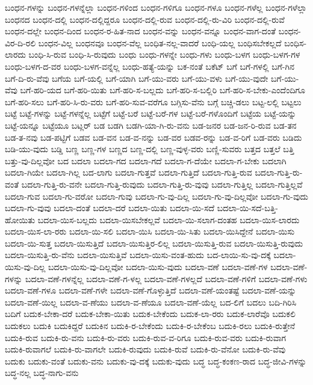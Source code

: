 {ಬಂಧನ-ಗಳನ್ನು
ಬಂಧನ-ಗಳನ್ನೆಲ್ಲಾ
ಬಂಧನ-ಗಳಿಂದ
ಬಂಧನ-ಗಳಿಗೂ
ಬಂಧನ-ಗಳೂ
ಬಂಧನ-ಗಳೆಲ್ಲ
ಬಂಧನ-ಗಳೆಲ್ಲಾ
ಬಂಧನದ
ಬಂಧನ-ದಲ್ಲಿ
ಬಂಧನ-ದಲ್ಲಿದ್ದರೂ
ಬಂಧನ-ದಲ್ಲಿ-ರುವ
ಬಂಧನ-ದಲ್ಲಿ-ರು-ವಿರಿ
ಬಂಧನ-ದಲ್ಲಿ-ರುವೆ
ಬಂಧನ-ದಲ್ಲೇ
ಬಂಧನ-ದಿಂದ
ಬಂಧನ-ರ-ಹಿತ-ನಾದ
ಬಂಧನ-ವನ್ನು
ಬಂಧನ-ವನ್ನೂ
ಬಂಧನ-ವಾಗ-ದಂತೆ
ಬಂಧನ-ವಿರ-ದಿ-ರಲಿ
ಬಂಧನ-ವಿಲ್ಲ
ಬಂಧನವೂ
ಬಂಧನ-ವೆಲ್ಲ
ಬಂಧಿತ-ನಲ್ಲ-ವಾದರೆ
ಬಂಧಿ-ಯಲ್ಲ
ಬಂಧಿಸಬೇಕಲ್ಲದೆ
ಬಂಧಿಸ-ಲಾರದು
ಬಂಧಿ-ಸಿ-ರುವ
ಬಂಧಿ-ಸಿ-ರುವುದು
ಬಂಧು
ಬಂಧು-ಗಳನ್ನೇ
ಬಂಧು-ಗಳು
ಬಂಧು-ಬಳಗ
ಬಂಧು-ಬಳಗ-ಗಳ
ಬಂಧು-ಬಳಗ-ದ-ವರ
ಬಂಧು-ಬಳಗ-ವನ್ನೆಲ್ಲ
ಬಂಧು-ಹತ್ಯೆ-ಯನ್ನು
ಬಕ-ನಂತೆ
ಬಕೆಟ್
ಬಗೆ
ಬಗೆ-ಗಳಲ್ಲಿ
ಬಗೆ-ಗಿನ
ಬಗೆ-ದಿ-ರು-ವೆವು
ಬಗೆಯ
ಬಗೆ-ಯಲ್ಲಿ
ಬಗೆ-ಯಾಗಿ
ಬಗೆ-ಯು-ವರು
ಬಗೆ-ಯು-ವಳು
ಬಗೆ-ಯು-ವುದೇ
ಬಗೆ-ಯು-ವೆವು
ಬಗೆ-ಹರಿ-ಯದ
ಬಗೆ-ಹರಿ-ಯಿತು
ಬಗೆ-ಹರಿ-ಸ-ಬಲ್ಲದು
ಬಗೆ-ಹರಿ-ಸ-ಬಲ್ಲಿರಿ
ಬಗೆ-ಹರಿ-ಸ-ಬೇಕು-ಎಂದೆಂದಿಗೂ
ಬಗೆ-ಹರಿ-ಸಲು
ಬಗೆ-ಹರಿ-ಸಿ-ರು-ವರು
ಬಗೆ-ಹರಿ-ಸುವ-ವರೆಗೂ
ಬಗ್ಗಿಸು-ವೆನು
ಬಗ್ಗೆ
ಬಚ್ಚಿ-ಡಲು
ಬಟ್ಟ-ಲಲ್ಲಿ
ಬಟ್ಟಲು
ಬಟ್ಟೆ
ಬಟ್ಟೆ-ಗಳನ್ನು
ಬಟ್ಟೆ-ಗಳನ್ನೆಲ್ಲ
ಬಟ್ಟೆಗೆ
ಬಟ್ಟೆ-ಬರೆ
ಬಟ್ಟೆ-ಬರೆ-ಗಳ
ಬಟ್ಟೆ-ಬರೆ-ಗಳೊಂದಿಗೆ
ಬಟ್ಟೆಯ
ಬಟ್ಟೆ-ಯನ್ನು
ಬಟ್ಟೆ-ಯನ್ನೂ
ಬಟ್ಟೆಯೂ
ಬಟ್ಲರ್
ಬಡ
ಬಡಗಿ
ಬಡಗಿ-ಯಾ-ಗಿ-ರು-ವನು
ಬಡ-ಜನರ
ಬಡ-ಜನ-ರಿ-ರುವ
ಬಡ-ತನ
ಬಡ-ತ-ನವು
ಬಡ-ಪಟ್ಟಿಗೆ
ಬಡವ
ಬಡ-ವನ
ಬಡ-ವ-ನನ್ನು
ಬಡ-ವರ
ಬಡವ-ರನ್ನು
ಬಡ-ವ-ರಿಗೆ
ಬಡ-ವರು
ಬಡಿದು
ಬಡಿ-ಯು-ವುದು
ಬಡ್ಡಿ
ಬಣ್ಣ
ಬಣ್ಣ-ಗಳ
ಬಣ್ಣದ
ಬಣ್ಣ-ದಲ್ಲಿ
ಬಣ್ಣ-ವುಳ್ಳ-ವರು
ಬಣ್ಣಿ-ಸುವರು
ಬತ್ತದ
ಬತ್ತಲೆ
ಬತ್ತಿ
ಬತ್ತು-ವು-ದಿಲ್ಲವೋ
ಬದ
ಬದಲಾ
ಬದಲಾ-ಗದ
ಬದಲಾ-ಗದೆ
ಬದಲಾ-ಗ-ದೆಯೇ
ಬದಲಾ-ಗ-ಬೇಕು
ಬದಲಾಗಿ
ಬದಲಾ-ಗಿಯೇ
ಬದಲಾ-ಗಿಲ್ಲ
ಬದ-ಲಾಗು
ಬದಲಾ-ಗುತ್ತವೆ
ಬದಲಾ-ಗುತ್ತಿದೆ
ಬದಲಾ-ಗುತ್ತಿ-ರುವ
ಬದಲಾ-ಗುತ್ತಿ-ರು-ವಂತೆ
ಬದಲಾ-ಗುತ್ತಿ-ರು-ವನೇ
ಬದಲಾ-ಗುತ್ತಿ-ರುವುದು
ಬದಲಾ-ಗುತ್ತಿ-ರು-ವುವು
ಬದಲಾ-ಗುತ್ತಿಲ್ಲ
ಬದಲಾ-ಗುತ್ತಿಲ್ಲವೆ
ಬದಲಾ-ಗುವ
ಬದಲಾ-ಗು-ವರೋ
ಬದಲಾ-ಗುವು
ಬದಲಾ-ಗು-ವು-ದಿಲ್ಲ
ಬದಲಾ-ಗು-ವು-ದಿಲ್ಲವೋ
ಬದಲಾ-ಗು-ವುದು
ಬದಲಾ-ಗು-ವುವು
ಬದಲಾ-ದಂತೆ
ಬದಲಾ-ದರೆ
ಬದಲಾ-ಯಿತು
ಬದಲಾ-ಯಿ-ಸದೆ
ಬದಲಾ-ಯಿ-ಸದೆ-ಬತ್ತಿ-ಹೋಯಿತು
ಬದಲಾ-ಯಿಸ-ಬಲ್ಲದು
ಬದಲಾ-ಯಿಸಬೇಕಲ್ಲವೆ
ಬದಲಾ-ಯಿ-ಸಲಾಗ-ದಂತಹ
ಬದಲಾ-ಯಿಸ-ಲಾರದು
ಬದಲಾ-ಯಿಸ-ಲಾ-ರರು
ಬದಲಾ-ಯಿ-ಸಲಿ
ಬದಲಾ-ಯಿಸಿ
ಬದಲಾ-ಯಿ-ಸಿತು
ಬದಲಾ-ಯಿಸಿದ್ದೇನೆ
ಬದಲಾ-ಯಿಸು
ಬದಲಾ-ಯಿ-ಸುತ್ತ
ಬದಲಾ-ಯಿಸುತ್ತಿದೆ
ಬದಲಾ-ಯಿಸುತ್ತಿರ-ಲಿಲ್ಲ
ಬದಲಾ-ಯಿಸುತ್ತಿ-ರುವ
ಬದಲಾ-ಯಿಸುತ್ತಿ-ರುವುದು
ಬದಲಾ-ಯಿಸುತ್ತಿ-ರು-ವೆನು
ಬದಲಾ-ಯಿಸುತ್ತಿವೆ
ಬದಲಾ-ಯಿಸು-ವಂತ-ಹುದು
ಬದ-ಲಾಯಿ-ಸು-ವು-ದಕ್ಕೆ
ಬದಲಾ-ಯಿಸು-ವು-ದಿಲ್ಲ
ಬದಲಾ-ಯಿಸು-ವು-ದಿಲ್ಲವೋ
ಬದಲಾ-ಯಿಸು-ವುದು
ಬದಲಾ-ವಣೆ
ಬದಲಾ-ವಣೆ-ಗಳ
ಬದಲಾ-ವಣೆ-ಗಳನ್ನು
ಬದಲಾ-ವಣೆ-ಗಳನ್ನೆಲ್ಲ
ಬದಲಾ-ವಣೆ-ಗ-ಳಲ್ಲ
ಬದಲಾ-ವಣೆ-ಗಳಲ್ಲದೆ
ಬದಲಾ-ವಣೆ-ಗಳಿಗೆ
ಬದಲಾ-ವಣೆ-ಗಳು
ಬದಲಾ-ವಣೆ-ಗಳೂ
ಬದಲಾ-ವಣೆ-ಗಳೇ
ಬದಲಾ-ವಣೆ-ಗೊಳ್ಳುತ್ತಿದೆ
ಬದಲಾ-ವಣೆ-ಯಂತಷ್ಟೆ
ಬದಲಾ-ವಣೆ-ಯನ್ನು
ಬದಲಾ-ವಣೆ-ಯಿಲ್ಲ
ಬದಲಾ-ವ-ಣೆಯು
ಬದಲಾ-ವ-ಣೆಯೂ
ಬದಲಾ-ವಣೆ-ಯೆಲ್ಲ
ಬದ-ಲಿಗೆ
ಬದಲು
ಬದಿ-ಗಿರಿಸಿ
ಬದಿಗೆ
ಬದುಕ-ಬೇಕಾ-ದರೆ
ಬದುಕ-ಬೇಕಾ-ಯಿತು
ಬದುಕ-ಬೇಕೆಂದು
ಬದುಕ-ಲಾ-ರರು
ಬದುಕ-ಲಾರೆವೊ
ಬದುಕಲಿ
ಬದುಕಲು
ಬದುಕಿ
ಬದುಕಿದ್ದರೆ
ಬದುಕಿನ
ಬದುಕಿ-ರ-ಬೇಕೆಂದು
ಬದುಕಿ-ರ-ಬೇಕೆಂಬ
ಬದುಕಿ-ರಲು
ಬದುಕಿ-ರುತ್ತೇನೆ
ಬದುಕಿ-ರುವ
ಬದುಕಿ-ರು-ವನು
ಬದುಕಿ-ರು-ವರು
ಬದುಕಿ-ರುವ-ವ-ರಿಗೂ
ಬದುಕಿ-ರುವ-ವರು
ಬದುಕಿ-ರುವಾಗ
ಬದುಕಿ-ರುವಾಗಲೆ
ಬದುಕಿ-ರು-ವಾಗಲೇ
ಬದುಕಿ-ರುವುದು
ಬದುಕಿ-ರುವೆ
ಬದುಕಿ-ರು-ವೆನೋ
ಬದುಕಿ-ರು-ವೆವು
ಬದುಕು
ಬದುಕು-ವಂತೆ
ಬದುಕು-ವನು
ಬದುಕು-ವು-ದಕ್ಕೆ
ಬದುಕು-ವುದು
ಬದ್ಧ
ಬದ್ಧ-ಕಂಕಣ-ರಾದ
ಬದ್ಧ-ಜೀವಿ-ಗಳನ್ನು
ಬದ್ಧ-ನಲ್ಲ
ಬದ್ಧ-ನಾಗು-ವನು
}
